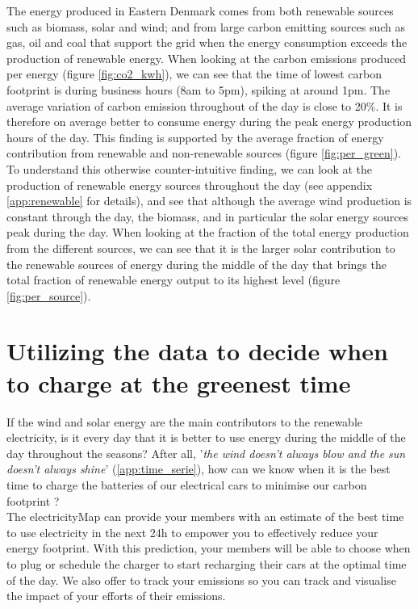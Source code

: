 \documentclass[11pt]{article} %
\begin{document}
The energy produced in Eastern Denmark comes from both renewable sources such as biomass, solar and wind; and from large carbon emitting sources such as gas, oil and coal that support the grid when the energy consumption exceeds the production of renewable energy.
When looking at the carbon emissions produced per energy (figure \ref{fig:co2_kwh}), we can see that the time of lowest carbon footprint is during business hours (8am to 5pm), spiking at around 1pm. The average variation of carbon emission throughout of the day is close to 20\%. It is therefore on average better to consume energy during the peak energy production hours of the day. This finding is supported by the average fraction of energy contribution from renewable and non-renewable sources (figure \ref{fig:per_green}).\\

To understand this otherwise counter-intuitive finding, we can look at the production of renewable energy sources throughout the day (see appendix \ref{app:renewable} for details), and see that although the average wind production is constant through the day, the biomass, and in particular the solar energy sources peak during the day. When looking at the fraction of the total energy production from the different sources, we can see that it is the larger solar contribution to the renewable sources of energy during the middle of the day that brings the total fraction of renewable energy output to its highest level (figure \ref{fig:per_source}).

\clearpage\newpage
\section{Utilizing the data to decide when to charge at the greenest time}
If the wind and solar energy are the main contributors to the renewable electricity, is it every day that it is better to use energy during the middle of the day throughout the seasons? After all, '\textit{the wind doesn't always blow and the sun doesn't always shine}' (\ref{app:time_serie}), how can we know when it is the best time to charge the batteries of our electrical cars to minimise our carbon footprint ?  \\

The electricityMap can provide your members with an estimate of the best time to use electricity in the next 24h to empower you to effectively reduce your energy footprint. With this prediction, your members will be able to choose when to plug or schedule the charger to start recharging their cars at the optimal time of the day. We also offer to track your emissions so you can track and visualise the impact of your efforts of their emissions.
\end{document}
